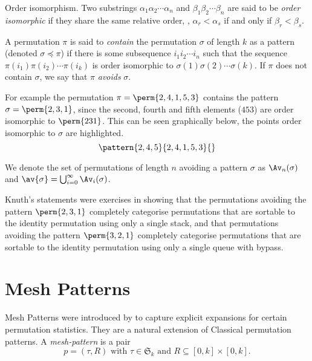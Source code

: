 \begin{definition}{Order isomorphism.}
    Two substrings \(\alpha_1\alpha_2\dotsm\alpha_n\) and
    \(\beta_1\beta_2\dotsm\beta_n\) are said to be \emph{order isomorphic}
    if they share the same relative order, \ie, \(\alpha_r<\alpha_s\) if and
    only if \(\beta_r<\beta_s\).
\end{definition}

A permutation \(\pi\) is said to \emph{contain} the permutation \(\sigma\) of
length \(k\) as a pattern (denoted \(\sigma \preceq \pi\)) if there is some
subsequence \(i_1i_2\dotsm{}i_n\) such that the sequence
\(\pi(i_1)\pi(i_2)\dotsm\pi(i_k)\) is order isomorphic to
\(\sigma(1)\sigma(2)\dotsm\sigma(k)\). If \(\pi\) does not contain
\(\sigma\), we say that \(\pi\) \emph{avoids} \(\sigma\).

For example the permutation \(\pi = \perm{2,4,1,5,3}\) contains the pattern
\(\sigma = \perm{2,3,1}\), since the second, fourth and fifth elements
(\(453\)) are order isomorphic to \(\perm{231}\).
This can be seen graphically below, the points order isomorphic to \(\sigma\)
are highlighted.
\begin{equation*}
    \pattern{2,4,5}{2,4,1,5,3}{}
\end{equation*}

We denote the set of permutations of length \(n\) avoiding a pattern \(\sigma\)
as \(\Av_n(\sigma)\) and \(\av{\sigma} = \bigcup_{i=0}^{\infty}\Av_i(\sigma)\).

Knuth's statements were exercises in showing that the permutations avoiding the
pattern \(\perm{2,3,1}\) completely categorise permutations that are sortable to
the identity permutation using only a single stack, and that permutations avoiding the
pattern \(\perm{3,2,1}\) completely categorise permutations that are sortable to
the identity permutation using only a single queue with bypass.

\section{Mesh Patterns}
Mesh Patterns were introduced by \textcite{journals/combinatorics/BrandenC11} to capture explicit expansions
for certain permutation statistics. They are a natural extension of Classical
permutation patterns. A \emph{mesh-pattern} is a pair
\begin{equation*}
    p = (\tau,R)\text{ with } \tau \in \mathfrak{S}_k \text{ and } R \subseteq
    [0,k]\times [0,k].
\end{equation*}

